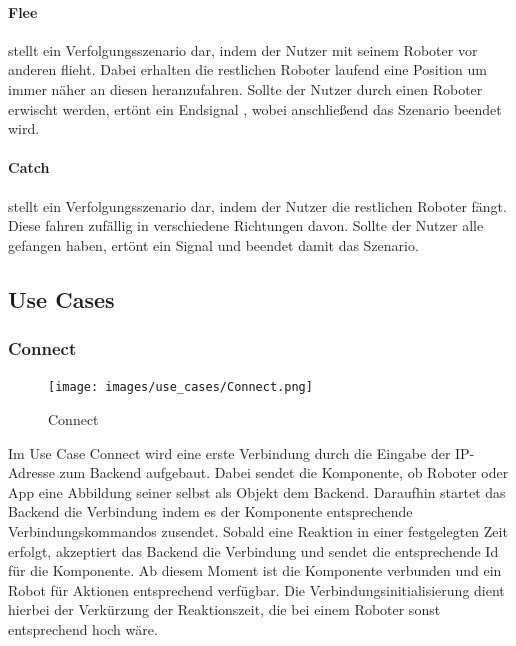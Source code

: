 \paragraph{Flee}

stellt ein Verfolgungsszenario dar, indem der Nutzer mit seinem Roboter vor anderen flieht. Dabei erhalten die restlichen Roboter laufend eine Position um immer näher an diesen heranzufahren. Sollte der Nutzer durch einen Roboter erwischt werden, ertönt ein Endsignal , wobei anschließend das Szenario beendet wird.

\paragraph{Catch}

stellt ein Verfolgungsszenario dar, indem der Nutzer die restlichen Roboter fängt. Diese fahren zufällig in verschiedene Richtungen davon. Sollte der Nutzer alle gefangen haben, ertönt ein Signal und beendet damit das Szenario.

\color{process}
\subsection{Use Cases}
\subsubsection{Connect}

\begin{figure}[h]
	\begin{center}
		\texttt{[image: images/use\_cases/Connect.png]}
	\end{center}
	\caption{Connect}
	\label{fig:UC_Connect}
\end{figure}

\noindent
Im Use Case Connect wird eine erste Verbindung durch die Eingabe der IP-Adresse zum Backend aufgebaut. Dabei sendet die Komponente, ob Roboter oder App eine Abbildung seiner selbst als Objekt dem Backend. Daraufhin startet das Backend die Verbindung indem es der Komponente entsprechende Verbindungskommandos zusendet. Sobald eine Reaktion in einer festgelegten Zeit erfolgt, akzeptiert das Backend die Verbindung und sendet die entsprechende Id für die Komponente. Ab diesem Moment ist die Komponente verbunden und ein Robot für Aktionen entsprechend verfügbar. Die Verbindungsinitialisierung dient hierbei der Verkürzung der Reaktionszeit, die bei einem Roboter sonst entsprechend hoch wäre.

